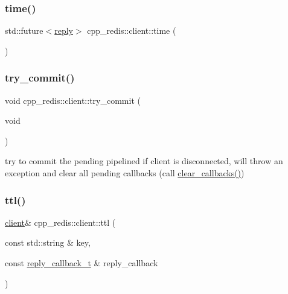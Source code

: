 \mbox{\label{classcpp__redis_1_1client_a7d0d5e0a02e97ad6d8733430489df321}} 
\subsubsection{\texorpdfstring{time()}{time()}\hspace{0.1cm}{\footnotesize\ttfamily [2/2]}}
{\footnotesize\ttfamily std\+::future$<$\hyperlink{classcpp__redis_1_1reply}{reply}$>$ cpp\+\_\+redis\+::client\+::time (\begin{DoxyParamCaption}{ }\end{DoxyParamCaption})}

\mbox{\label{classcpp__redis_1_1client_a6c7aff2567b5ca7f527faa4f2ebca405}} 
\subsubsection{\texorpdfstring{try\+\_\+commit()}{try\_commit()}}
{\footnotesize\ttfamily void cpp\+\_\+redis\+::client\+::try\+\_\+commit (\begin{DoxyParamCaption}\item[{void}]{ }\end{DoxyParamCaption})\hspace{0.3cm}{\ttfamily [private]}}

try to commit the pending pipelined if client is disconnected, will throw an exception and clear all pending callbacks (call \hyperlink{classcpp__redis_1_1client_a64585796534941c024eaaa72f93d8977}{clear\+\_\+callbacks()}) \mbox{\label{classcpp__redis_1_1client_a667bb7a6ead9c8cdaba534033a467367}} 
\subsubsection{\texorpdfstring{ttl()}{ttl()}\hspace{0.1cm}{\footnotesize\ttfamily [1/2]}}
{\footnotesize\ttfamily \hyperlink{classcpp__redis_1_1client}{client}\& cpp\+\_\+redis\+::client\+::ttl (\begin{DoxyParamCaption}\item[{const std\+::string \&}]{key,  }\item[{const \hyperlink{classcpp__redis_1_1client_a061a1140d36d2eaeda82b09a0bb3f9f2}{reply\+\_\+callback\+\_\+t} \&}]{reply\+\_\+callback }\end{DoxyParamCaption})}

